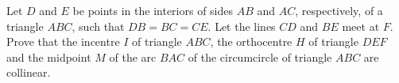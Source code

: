 Let $D$ and $E$ be points in the interiors of sides $AB$ and $AC$, respectively, of a triangle $ABC$, such that $DB = BC = CE$. Let the lines $CD$ and $BE$ meet at $F$. Prove that the incentre $I$ of triangle $ABC$, the orthocentre $H$ of triangle $DEF$ and the midpoint $M$ of the arc $BAC$ of the circumcircle of triangle $ABC$ are collinear.